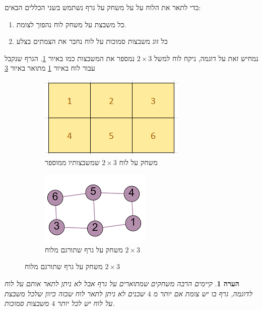 \documentclass[12pt,leqno]{article}
\theoremstyle{theoremdd}
\newtheorem{comm}{הערה}[section]
\begin{document}
כדי לתאר את הלוח על על משחק על גרף נשתמש בשני הכללים הבאים:
\begin{enumerate}
    \item 
    כל משבצת על משחק לוח נהפוך לצומת.
    \item 
    כל זוג משבצות סמוכות על לוח נחבר את הצמתים בצלע
\end{enumerate}

נמחיש זאת על דוגמה, ניקח לוח למשל
$2 \times 3$
נמספר את המשבצות כמו באיור
\ref{2x3_board}.
הגרף שנקבל עבור לוח באיור
\ref{2x3_board}
מתואר באיור
\ref{2x3_graph}

\begin{figure}[ht]
    \caption{
        דוגמה
        למשחק על לוח שתורגם למשחק על גרף
        }
    \begin{subfigure}{.5\textwidth}
        \caption{
            משחק על לוח
            $2 \times 3$
            שמשבצותיו
            ממוספר
        }
        \label{2x3_board}
        \centering
        \includegraphics[scale=0.9]{images/2x3_board.PNG}
    \end{subfigure}%
    \begin{subfigure}{.5\textwidth}
        \caption{
            משחק על גרף
            שתורגם מלוח
            $2 \times 3$
        }
        \centering
        \label{2x3_graph}
        \includegraphics[scale=1]{images/2x3_graph.png}
    \end{subfigure}%
\end{figure}


\begin{comm}
    קיימים הרבה משחקים שמתוארים על גרף אבל לא ניתן לתאר אותם על לוח
    לדוגמה,
    גרף בו יש צומת אם יותר מ
    $4$
    שכנים לא ניתן לתאר לוח שכזה כיוון שלכל משבצת על לוח
    יש לכל יותר 
    $4$
    משבצות סמוכות.
\end{comm}
\end{document}
